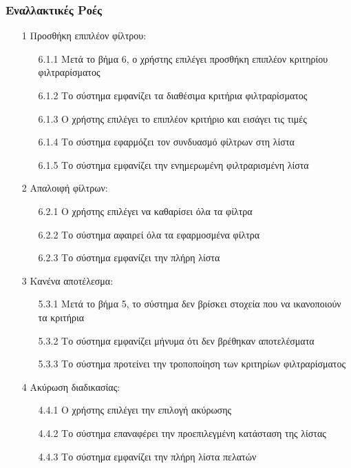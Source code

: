 \documentclass[12pt,a4paper,twoside]{book}
\begin{document}
\subsubsection{Εναλλακτικές Ροές}
\begin{enumerate}
  \item[1 ] Προσθήκη επιπλέον φίλτρου:
        \begin{enumerate}
          \item[6.1.1 ] Μετά το βήμα 6, ο χρήστης επιλέγει προσθήκη επιπλέον κριτηρίου φιλτραρίσματος
          \item[6.1.2 ] Το σύστημα εμφανίζει τα διαθέσιμα κριτήρια φιλτραρίσματος %
          \item[6.1.3 ] Ο χρήστης επιλέγει το επιπλέον κριτήριο και εισάγει τις τιμές
          \item[6.1.4 ] Το σύστημα εφαρμόζει τον συνδυασμό φίλτρων στη λίστα %
          \item[6.1.5 ] Το σύστημα εμφανίζει την ενημερωμένη φιλτραρισμένη λίστα
        \end{enumerate}
  \item[2 ] Απαλοιφή φίλτρων:
        \begin{enumerate}
          \item[6.2.1 ] Ο χρήστης επιλέγει να καθαρίσει όλα τα φίλτρα
          \item[6.2.2 ] Το σύστημα αφαιρεί όλα τα εφαρμοσμένα φίλτρα
          \item[6.2.3 ] Το σύστημα εμφανίζει την πλήρη λίστα
        \end{enumerate}
  \item[3 ] Κανένα αποτέλεσμα:
        \begin{enumerate}
          \item[5.3.1 ] Μετά το βήμα 5, το σύστημα δεν βρίσκει στοχεία που να ικανοποιούν τα κριτήρια %
          \item[5.3.2 ] Το σύστημα εμφανίζει μήνυμα ότι δεν βρέθηκαν αποτελέσματα %
          \item[5.3.3 ] Το σύστημα προτείνει την τροποποίηση των κριτηρίων φιλτραρίσματος
        \end{enumerate}
  \item[4 ] Ακύρωση διαδικασίας:  %
        \begin{enumerate}
          \item[4.4.1 ] Ο χρήστης επιλέγει την επιλογή ακύρωσης
          \item[4.4.2 ] Το σύστημα επαναφέρει την προεπιλεγμένη κατάσταση της λίστας
          \item[4.4.3 ] Το σύστημα εμφανίζει την πλήρη λίστα πελατών
        \end{enumerate}
\end{enumerate}
\end{document}
